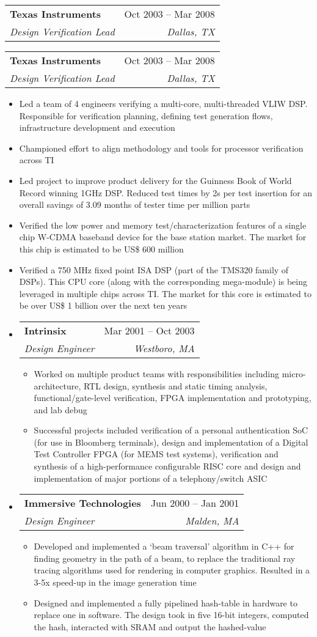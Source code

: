 \documentclass[letterpaper,12pt]{article}[leftmargin=*]
\makeatletter
\def \entryspacing {-0pt}
\newcommand{\resumeEntryStart}{\begin{itemize}[leftmargin=2.5mm]}
\newcommand{\resumeEntryEnd}{\end{itemize}\vspace{\entryspacing}}
\newcommand{\resumeItemListStart}{\begin{itemize}[leftmargin=4.5mm]}
\newcommand{\resumeItemListEnd}{\end{itemize}}
\newcommand{\resumeItem}[1]{
\item\small{
  {#1 \vspace{-2pt}}
}
}
\newcommand{\resumeEntryTSDL}[4]{
  \vspace{-1pt}\item[]
  \begin{tabularx}{0.97\textwidth}{X@{\hspace{60pt}}r}
    \textbf{\color{primary}#1} & {\firabook\color{accent}\small#2} \\
    \textit{\color{accent}\small#3} & \textit{\color{accent}\small#4} \\
  \end{tabularx}\vspace{-6pt}
}
\newcommand{\resumeEntryTSDLpart}[2]{
  \vspace{-6pt}\item[]
  \begin{tabularx}{0.97\textwidth}{X@{\hspace{60pt}}r}
    \textit{\color{accent}\small#1} & \textit{\color{accent}\small#2} \\
  \end{tabularx}\vspace{-6pt}
}
\makeatother
\begin{document}
\resumeEntryStart
{} {
\resumeEntryTSDL
   {Texas Instruments}{Oct 2003 -- Mar 2008}
   {Design Verification Lead}{Dallas, TX}  
}{
\resumeEntryTSDL
   {Texas Instruments}{Oct 2003 -- Mar 2008}
   {Design Verification Lead}{Dallas, TX}
}    
   \resumeItemListStart
   \resumeItem {Led a team of 4 engineers verifying a multi-core, multi-threaded VLIW DSP. Responsible for verification planning, defining test generation flows, infrastructure development and execution}
   \resumeItem {Championed effort to align methodology and tools for processor verification across TI}
   \resumeItem {Led project to improve product delivery for the Guinness Book of World Record winning 1GHz DSP. Reduced test times by 2s per test insertion for an overall savings of 3.09 months of tester time per million parts}
   \resumeItem {Verified the low power and memory test/characterization features of a single chip W-CDMA baseband device for the base station market. The market for this chip is estimated to be US\$ 600 million}   
   \resumeItem {Verified a 750 MHz fixed point ISA DSP (part of the TMS320 family of DSPs). This CPU core (along with the corresponding mega-module) is being leveraged in multiple chips across TI. The market for this core is estimated to be over US\$ 1 billion over the next ten years}
   \resumeItemListEnd
\resumeEntryEnd   

\resumeEntryStart
\resumeEntryTSDL
   {Intrinsix}{Mar 2001 -- Oct 2003}
   {Design Engineer}{Westboro, MA}
   \resumeItemListStart
   \resumeItem {Worked on multiple product teams with responsibilities including micro-architecture, RTL design, synthesis and static timing analysis, functional/gate-level verification, FPGA implementation and prototyping, and lab debug}
   \resumeItem {Successful projects included verification of a personal authentication SoC (for use in Bloomberg terminals), design and implementation of a Digital Test Controller FPGA (for MEMS test systems), verification and synthesis of a high-performance configurable RISC core and design and implementation of major portions of a telephony/switch ASIC}
   \resumeItemListEnd
\resumeEntryEnd

\resumeEntryStart
\resumeEntryTSDL
   {Immersive Technologies}{Jun 2000 -- Jan 2001}
   {Design Engineer}{Malden, MA}
   \resumeItemListStart
   \resumeItem {Developed and implemented a ‘beam traversal’ algorithm in C++ for finding geometry in the path of a beam, to replace the traditional ray tracing algorithms used for rendering in computer graphics. Resulted in a 3-5x speed-up in the image generation time}
   \resumeItem {Designed and implemented a fully pipelined hash-table in hardware to replace one in software. The design took in five 16-bit integers, computed the hash, interacted with SRAM and output the hashed-value}
   \resumeItemListEnd
\resumeEntryEnd
\end{document}
